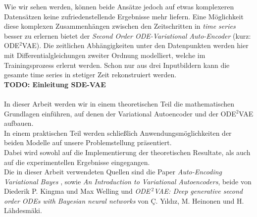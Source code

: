 \documentclass[12pt]{article}
\begin{document}
	Wie wir sehen werden, können beide Ansätze jedoch auf etwas komplexeren Datensätzen keine zufriedenstellende Ergebnisse mehr liefern.
	Eine Möglichkeit diese komplexen Zusammenhängen zwischen den Zeitschritten in \emph{time series} besser zu erlernen bietet der \emph{Second Order ODE-Variational Auto-Encoder} (kurz: ODE$^2$VAE). Die zeitlichen Abhängigkeiten unter den Datenpunkten werden hier mit Differentialgleichungen zweiter Ordnung modelliert, welche im Trainingsprozess erlernt werden. Schon nur aus drei Inputbildern kann die gesamte time series in stetiger Zeit rekonstruiert werden.\\
	\textbf{TODO: Einleitung SDE-VAE}
	\\
	\\
	In dieser Arbeit werden wir in einem theoretischen Teil die mathematischen Grundlagen einführen, auf denen der Variational Autoencoder und der ODE$^2$VAE aufbauen.\\
	In einem praktischen Teil werden schließlich Anwendungsmöglichkeiten der beiden Modelle auf unsere Problemstellung präsentiert.\\
	Dabei wird sowohl auf die Implementierung der
	theoretischen Resultate, als auch auf die experimentellen Ergebnisse eingegangen.\\
	Die in dieser Arbeit verwendeten Quellen sind die Paper \emph{Auto-Encoding Variational Bayes} \cite{vae}, sowie \emph{An Introduction to Variational Autoencoders}, \cite{intvae} beide von Diederik P. Kingma und Max Welling und \emph{ODE$^{\ 2}$VAE: Deep generative second order ODEs with Bayesian neural networks} \cite{ode2vae} von Ç. Yıldız, M. Heinonen und H. Lähdesmäki.
	\newpage
\end{document}
